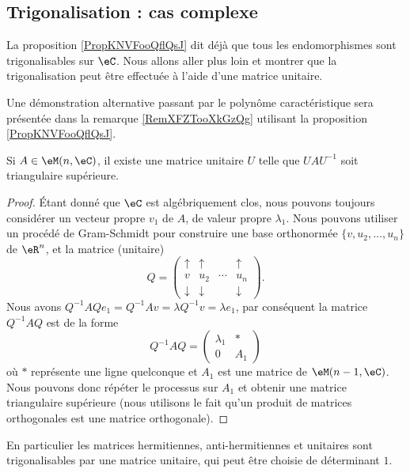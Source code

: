 \subsection{Trigonalisation : cas complexe}

La proposition \ref{PropKNVFooQflQsJ} dit déjà que tous les endomorphismes sont trigonalisables sur \( \eC\). Nous allons aller plus loin et montrer que la trigonalisation peut être effectuée à l'aide d'une matrice unitaire. 

Une démonstration alternative passant par le polynôme caractéristique sera présentée dans la remarque \ref{RemXFZTooXkGzQg} utilisant la proposition \ref{PropKNVFooQflQsJ}.
\begin{lemma}  \label{LemSchurComplHAftTq}
    Si \( A\in\eM(n,\eC)\), il existe une matrice unitaire \( U\) telle que \( UAU^{-1}\) soit triangulaire supérieure.
\end{lemma}

\begin{proof}
    Étant donné que \( \eC\) est algébriquement clos, nous pouvons toujours considérer un vecteur propre \( v_1\) de \( A\), de valeur propre \( \lambda_1\). Nous pouvons utiliser un procédé de Gram-Schmidt pour construire une base orthonormée \( \{ v,u_2,\ldots, u_n \}\) de \( \eR^n\), et la matrice (unitaire)
    \begin{equation}
        Q=\begin{pmatrix}
             \uparrow   &   \uparrow    &       &   \uparrow    \\
             v   &   u_2    &   \cdots    &   u_n    \\ 
             \downarrow   &   \downarrow    &       &   \downarrow
         \end{pmatrix}.
    \end{equation}
    Nous avons \( Q^{-1}AQe_1=Q^{-1} Av=\lambda Q^{-1} v=\lambda e_1\), par conséquent la matrice \( Q^{-1} AQ\) est de la forme
    \begin{equation}
        Q^{-1}AQ=\begin{pmatrix}
            \lambda_1    &   *    \\ 
            0    &   A_1    
        \end{pmatrix}
    \end{equation}
    où \( *\) représente une ligne quelconque et \( A_1\) est une matrice de \( \eM(n-1,\eC)\). Nous pouvons donc répéter le processus sur \( A_1\) et obtenir une matrice triangulaire supérieure (nous utilisons le fait qu'un produit de matrices orthogonales est une matrice orthogonale).  
\end{proof}
En particulier les matrices hermitiennes, anti-hermitiennes et unitaires sont trigonalisables par une matrice unitaire, qui peut être choisie de déterminant \( 1\).

